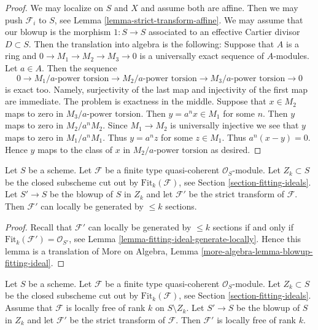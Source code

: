 \begin{proof}
We may localize on $S$ and $X$ and assume both are affine.
Then we may push $\mathcal{F}_i$ to $S$, see
Lemma \ref{lemma-strict-transform-affine}.
We may assume that our blowup is the morphism $1 : S \to S$
associated to an effective Cartier divisor $D \subset S$.
Then the translation into algebra is the following: Suppose that $A$
is a ring and $0 \to M_1 \to M_2 \to M_3 \to 0$ is a universally
exact sequence of $A$-modules. Let $a\in A$. Then the sequence
$$
0 \to
M_1/a\text{-power torsion} \to
M_2/a\text{-power torsion} \to
M_3/a\text{-power torsion} \to 0
$$
is exact too. Namely, surjectivity of the last map and injectivity of
the first map are immediate. The problem is exactness in the middle.
Suppose that $x \in M_2$ maps to zero in $M_3/a\text{-power torsion}$.
Then $y = a^n x \in M_1$ for some $n$. Then $y$ maps to zero in
$M_2/a^nM_2$. Since $M_1 \to M_2$ is universally injective we see that
$y$ maps to zero in $M_1/a^nM_1$. Thus $y = a^n z$ for some $z \in M_1$.
Thus $a^n(x - y) = 0$. Hence $y$ maps to the class of $x$ in
$M_2/a\text{-power torsion}$ as desired.
\end{proof}

\begin{lemma}
\label{lemma-strict-transform-blowup-fitting-ideal}
Let $S$ be a scheme. Let $\mathcal{F}$ be a finite type
quasi-coherent $\mathcal{O}_S$-module. Let $Z_k \subset S$ be the closed
subscheme cut out by $\text{Fit}_k(\mathcal{F})$, see
Section \ref{section-fitting-ideals}.
Let $S' \to S$ be the blowup of $S$ in $Z_k$ and let
$\mathcal{F}'$ be the strict transform of $\mathcal{F}$.
Then $\mathcal{F}'$ can locally be generated by $\leq k$
sections.
\end{lemma}

\begin{proof}
Recall that $\mathcal{F}'$ can locally be generated by $\leq k$
sections if and only if $\text{Fit}_k(\mathcal{F}') = \mathcal{O}_{S'}$, see
Lemma \ref{lemma-fitting-ideal-generate-locally}.
Hence this lemma is a translation of
More on Algebra, Lemma \ref{more-algebra-lemma-blowup-fitting-ideal}.
\end{proof}

\begin{lemma}
\label{lemma-strict-transform-blowup-fitting-ideal-locally-free}
Let $S$ be a scheme. Let $\mathcal{F}$ be a finite type
quasi-coherent $\mathcal{O}_S$-module. Let $Z_k \subset S$ be the closed
subscheme cut out by $\text{Fit}_k(\mathcal{F})$, see
Section \ref{section-fitting-ideals}.
Assume that $\mathcal{F}$ is locally free of rank $k$ on $S \setminus Z_k$.
Let $S' \to S$ be the blowup of $S$ in $Z_k$ and let
$\mathcal{F}'$ be the strict transform of $\mathcal{F}$.
Then $\mathcal{F}'$ is locally free of rank $k$.
\end{lemma}

